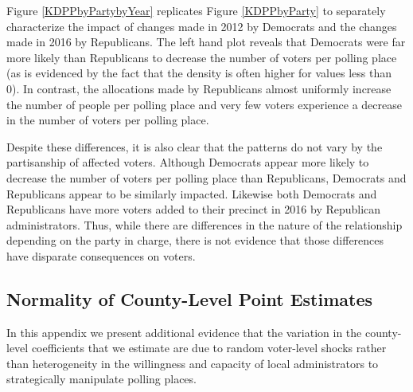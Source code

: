 \documentclass[12pt]{article}
\begin{document}
Figure \ref{KDPPbyPartybyYear} replicates Figure \ref{KDPPbyParty} to separately characterize the impact of changes made in 2012 by Democrats and the changes made in 2016 by Republicans.  The left hand plot reveals that Democrats were far more likely than Republicans to decrease the number of voters per polling place (as is evidenced by the fact that the density is often higher for values less than 0). In contrast, the allocations made by Republicans almost uniformly increase the number of people per polling place and very few voters experience a decrease in the number of voters per polling place.

Despite these differences, it is also clear that the patterns do not vary by the partisanship of affected voters.  Although Democrats appear more likely to decrease the number of voters per polling place than Republicans, Democrats and Republicans appear to be similarly impacted. Likewise both Democrats and Republicans have more voters added to their precinct in 2016 by Republican administrators. Thus, while there are differences in the nature of the relationship depending on the party in charge, there is not evidence that those differences have disparate consequences on voters.


\clearpage \newpage
\subsection{Normality of County-Level Point Estimates}\label{appendix_county_point_estimate_distributions}
\setcounter{table}{0}
\setcounter{figure}{0}
\renewcommand{\thetable}{E\arabic{table}}
\renewcommand{\thefigure}{E\arabic{figure}}

In this appendix we present additional evidence that the variation in the county-level coefficients that we estimate are due to random voter-level shocks rather than heterogeneity in the willingness and capacity of local administrators to strategically manipulate polling places.
\end{document}
